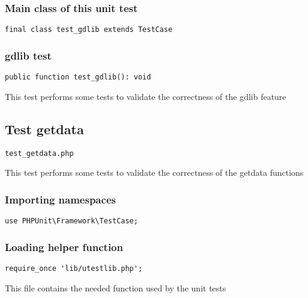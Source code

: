\documentclass[a4paper]{article}
\begin{document}
\hypertarget{toc191}{}
\subsubsection{Main class of this unit test}

\begin{lstlisting}
final class test_gdlib extends TestCase
\end{lstlisting}

\hypertarget{toc192}{}
\subsubsection{gdlib test}

\begin{lstlisting}
public function test_gdlib(): void
\end{lstlisting}

This test performs some tests to validate the correctness
of the gdlib feature

\hypertarget{toc193}{}
\subsection{Test getdata}

\begin{lstlisting}
test_getdata.php
\end{lstlisting}

This test performs some tests to validate the correctness
of the getdata functions

\hypertarget{toc194}{}
\subsubsection{Importing namespaces}

\begin{lstlisting}
use PHPUnit\Framework\TestCase;
\end{lstlisting}

\hypertarget{toc195}{}
\subsubsection{Loading helper function}

\begin{lstlisting}
require_once 'lib/utestlib.php';
\end{lstlisting}

This file contains the needed function used by the unit tests

\hypertarget{toc196}{}
\end{document}
